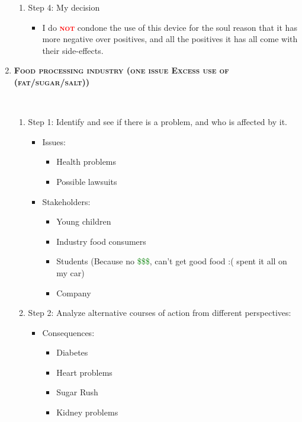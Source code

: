 \documentclass[a4paper, 10pt]{article}
\newcommand{\important}[1]{\textcolor{red}{\textbf{\textsc{#1}}}}
\newcommand{\miniHeader}[1]{\begin{large}\textbf{\textsc{#1}}\end{large}}
\begin{document}
\begin{enumerate}
\begin{enumerate}
							\item Step 4: My decision
							\begin{itemize}
								\item I do \important{not} condone the use of this device for the soul reason that it has more negative over positives, and all the positives it has all come with their side-effects.
							\end{itemize}
						\end{enumerate}
					\item \miniHeader{Food processing industry (one issue Excess use of (fat/sugar/salt))} \\
						\begin{enumerate}
								\item Step 1: Identify and see if there is a problem, and who is affected by it.
								\begin{itemize}
									\item Issues:
									\begin{itemize}
										\item Health problems
										\item Possible lawsuits
									\end{itemize}
									
									\item Stakeholders:
									\begin{itemize}
										\item Young children
										\item Industry food consumers
										\item Students (Because no \textcolor{green}{\$\$\$}, can't get good food :( spent it all on my car)
										\item Company
									\end{itemize}
								\end{itemize}
								
								\item Step 2: Analyze alternative courses of action from different perspectives:
								\begin{itemize}
									\item Consequences:
									\begin{itemize}
										\item Diabetes 
										\item Heart problems
										\item Sugar Rush
										\item Kidney problems
									\end{itemize}
								

\end{itemize}
\end{enumerate}
\end{enumerate}
\end{document}
